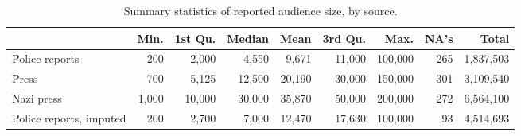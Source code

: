 \begin{table}[t!]
\centering
\caption{Summary statistics of reported audience size, by source.\label{tab:audiencesumstats}} 
\begingroup\small
\begin{tabular}{lrrrrrrrr}
  \toprule
 & Min. & 1st Qu. & Median & Mean & 3rd Qu. & Max. & NA's & Total \\ 
  \midrule
Police reports & 200 & 2,000 & 4,550 & 9,671 & 11,000 & 100,000 & 265 & 1,837,503 \\ 
  Press & 700 & 5,125 & 12,500 & 20,190 & 30,000 & 150,000 & 301 & 3,109,540 \\ 
  Nazi press & 1,000 & 10,000 & 30,000 & 35,870 & 50,000 & 200,000 & 272 & 6,564,100 \\ 
   \midrule
Police reports, imputed & 200 & 2,700 & 7,000 & 12,470 & 17,630 & 100,000 & 93 & 4,514,693 \\ 
   \bottomrule
\end{tabular}
\endgroup
\end{table}
